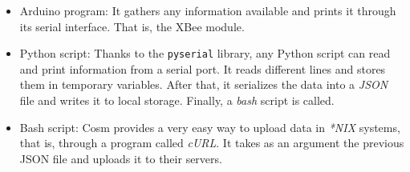 \documentclass[a4paper,twocolumn]{IEEEtran}
\begin{document}
        \begin{itemize}
            \item Arduino program: It gathers any information available and prints it through its serial interface. That is, the XBee module.
            \item Python script: Thanks to the \texttt{pyserial} library, any Python script can read and print information from a serial port. It reads different lines and stores them in temporary variables. After that, it serializes the data into a \emph{JSON} file and writes it to local storage. Finally, a \emph{bash} script is called.
            \item Bash script: Cosm provides a very easy way to upload data in \emph{*NIX} systems, that is, through a program called \emph{cURL}. It takes as an argument the previous JSON file and uploads it to their servers.
        \end{itemize}



\end{document}
